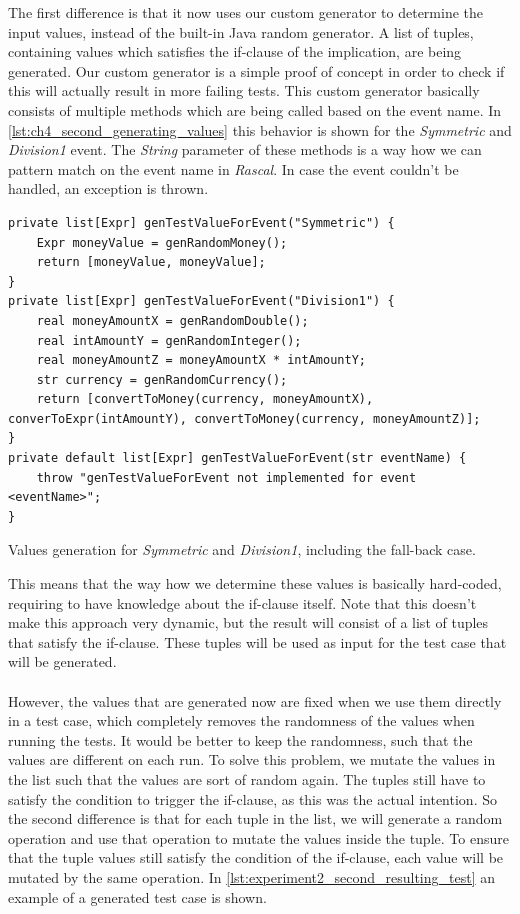 The first difference is that it now uses our custom generator to determine the input values, instead of the built-in Java random generator. A list of tuples, containing values which satisfies the if-clause of the implication, are being generated. Our custom generator is a simple proof of concept in order to check if this will actually result in more failing tests. This custom generator basically consists of multiple methods which are being called based on the event name. In \autoref{lst:ch4_second_generating_values} this behavior is shown for the \textit{Symmetric} and \textit{Division1} event. The \textit{String} parameter of these methods is a way how we can pattern match on the event name in \textit{Rascal}. In case the event couldn't be handled, an exception is thrown.
\FloatBarrier
\begin{sourcecode}[!ht]
\begin{lstlisting}[language=Rascal]
private list[Expr] genTestValueForEvent("Symmetric") {
    Expr moneyValue = genRandomMoney();
    return [moneyValue, moneyValue];
}
private list[Expr] genTestValueForEvent("Division1") {
    real moneyAmountX = genRandomDouble();
    real intAmountY = genRandomInteger();
    real moneyAmountZ = moneyAmountX * intAmountY;
    str currency = genRandomCurrency();
    return [convertToMoney(currency, moneyAmountX), converToExpr(intAmountY), convertToMoney(currency, moneyAmountZ)];
}
private default list[Expr] genTestValueForEvent(str eventName) {
    throw "genTestValueForEvent not implemented for event <eventName>";
}
\end{lstlisting}
\caption{Values generation for \textit{Symmetric} and \textit{Division1}, including the fall-back case.}
\label{lst:ch4_second_generating_values}
\end{sourcecode}
\FloatBarrier
This means that the way how we determine these values is basically hard-coded, requiring to have knowledge about the if-clause itself. Note that this doesn't make this approach very dynamic, but the result will consist of a list of tuples that satisfy the if-clause. These tuples will be used as input for the test case that will be generated.\\
\\
However, the values that are generated now are fixed when we use them directly in a test case, which completely removes the randomness of the values when running the tests. It would be better to keep the randomness, such that the values are different on each run. To solve this problem, we mutate the values in the list such that the values are sort of random again. The tuples still have to satisfy the condition to trigger the if-clause, as this was the actual intention. So the second difference is that for each tuple in the list, we will generate a random operation and use that operation to mutate the values inside the tuple. To ensure that the tuple values still satisfy the condition of the if-clause, each value will be mutated by the same operation. In \autoref{lst:experiment2_second_resulting_test} an example of a generated test case is shown.

